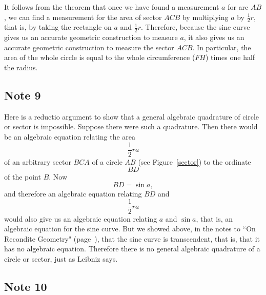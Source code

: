 \documentclass[polutonikogreek,english,twoside,openright]{article}
\begin{document}
It follows from the theorem that once we have found a measurement $a$
for arc $AB$, we can find a measurement for the area of sector $ACB$
by multiplying $a$ by $\frac{1}{2}r$, that is, by taking the rectangle
on $a$ and $\frac{1}{2}r$.  Therefore, because the sine curve gives us
an accurate geometric construction to measure $a$, it also gives us an
accurate geometric construction to measure the sector $ACB$.  In
particular, the area of the whole circle is equal to the whole
circumference ($FH$) times one half the radius.

\subsection*{Note 9}
\label{ctp9}

Here is a reductio argument to show that a general algebraic
quadrature of circle or sector is impossible.  Suppose there were such
a quadrature.  Then there would be an algebraic equation relating the
area
$$\frac{1}{2}ra$$
of an arbitrary sector $BCA$ of a circle $AB$ (see Figure~\ref{sector}) to the ordinate 
$$BD$$
of the point $B$.  Now
$$BD = \sin a,$$
and  therefore an algebraic equation relating $BD$ and 
$$\frac{1}{2}ra$$
would also give us an algebraic equation relating $a$ and $\sin a$,
that is, an algebraic equation for the sine curve.  But we showed
above, in the notes to ``On Recondite Geometry"
(page~\pageref{sintran}), that the sine curve is transcendent, that
is, that it has no algebraic equation.  Therefore there is no general
algebraic quadrature of a circle or sector, just as Leibniz says.

\subsection*{Note 10}
\label{ctp10}
\end{document}
